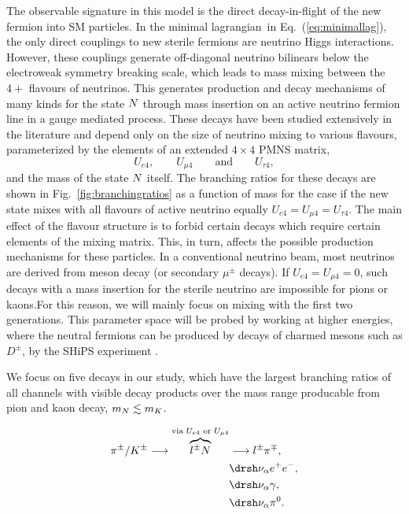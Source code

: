 \documentclass[11pt, a4paper]{article}
\newcommand{\refeq}[1]{Eq.~(\ref{#1})}
\newcommand{\reffig}[1]{Fig.~\ref{#1}}
\def\lagrangian{lagrangian}
\def\ster{\ensuremath N}
\begin{document}
The observable signature in this model is the direct decay-in-flight of the new
fermion into SM particles. In the minimal \lagrangian\ in
\refeq{eq:minimallag}, the only direct couplings to new sterile fermions are
neutrino Higgs interactions. However, these couplings generate off-diagonal
neutrino bilinears below the electroweak symmetry breaking scale, which leads
to mass mixing between the $4+$ flavours of neutrinos. This generates
production and decay mechanisms of many kinds for the state $\ster$ through
mass insertion on an active neutrino fermion line in a gauge mediated process.
These decays have been studied extensively in the literature \cite{Atre:2009rg}
and depend only on the size of neutrino mixing to various flavours,
parameterized by the elements of an extended $4\times4$ PMNS matrix,
%
\[ U_{e4}, \qquad U_{\mu 4} \qquad \text{and} \qquad U_{\tau 4},  \]
%
and the mass of the state $\ster$ itself. The branching ratios for these decays
are shown in \reffig{fig:branchingratios} as a function of mass for the case if
the new state mixes with all flavours of active neutrino equally $U_{e4}=U_{\mu
4}=U_{\tau 4}$. The main effect of the flavour structure is to forbid certain
decays which require certain elements of the mixing matrix. This, in turn,
affects the possible production mechanisms for these particles. In a
conventional neutrino beam, most neutrinos are derived from meson decay (or
secondary $\mu^\pm$ decays). If $U_{e4}=U_{\mu 4}=0$, such decays with a mass
insertion for the sterile neutrino are impossible for pions or kaons.For this
reason, we will mainly focus on mixing with the first two generations. This
parameter space will be probed by working at higher energies, where the neutral
fermions can be produced by decays of charmed mesons such as $D^\pm$, by the
SHiPS experiment \cite{Alekhin:2015byh, Anelli:2015pba}.   

We focus on five decays in our study, which have the largest branching ratios
of all channels with visible decay products over the mass range producable from
pion and kaon decay, $m_{\ster} \lesssim m_K$.

\begin{align*}
	\pi^\pm / K^\pm \longrightarrow \overbrace{l^\pm \ster}^{\text{via } U_{e4} \text{ or } U_{\mu 4}}  &\longrightarrow  l^\pm \pi^\mp, \\
						& \drsh \nu_\alpha e^+ e^-, \\
						& \drsh \nu_\alpha \gamma, \\
						& \drsh \nu_\alpha \pi^0. \\
\end{align*}
\end{document}
